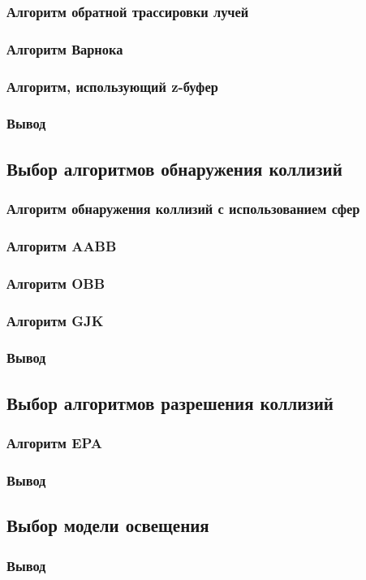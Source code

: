 \subsubsection{Алгоритм обратной трассировки лучей}

\subsubsection{Алгоритм Варнока}

\subsubsection{Алгоритм, использующий z-буфер}

\subsubsection*{Вывод}

\subsection{Выбор алгоритмов обнаружения коллизий}

\subsubsection{Алгоритм обнаружения коллизий с использованием сфер}

\subsubsection{Алгоритм AABB}

\subsubsection{Алгоритм OBB}

\subsubsection{Алгоритм GJK}

\subsubsection*{Вывод}

\subsection{Выбор алгоритмов разрешения коллизий}

\subsubsection{Алгоритм EPA}

\subsubsection*{Вывод}

\subsection{Выбор модели освещения}

\subsubsection*{Вывод}
